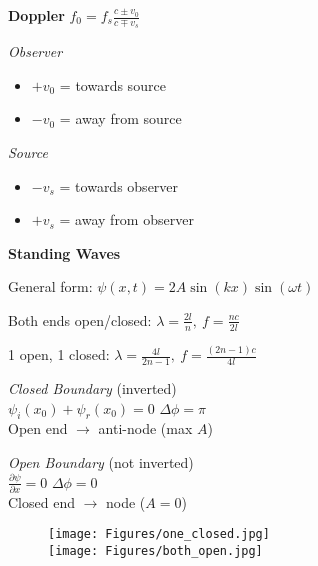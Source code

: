 \documentclass[twocolumn]{article}
\begin{document}
\small

\textbf{Doppler} \hspace{8em} $f_0 = f_s \frac{c \pm v_0}{c \mp v_s}$

\begin{multicols}{2}
    \textit{Observer} \vspace{-1em}
    \begin{itemize}
        \item $+v_0$ = towards source
        \item $-v_0$ = away from source
    \end{itemize}

    \textit{Source} \vspace{-1em}
    \begin{itemize}
        \item $-v_s$ = towards observer
        \item $+v_s$ = away from observer
    \end{itemize}
\end{multicols} \vspace{-1.5em}

\dotfill

\textbf{Standing Waves}

General form: $\psi(x, t) = 2A \sin(kx) \sin(\omega t)$

Both ends open/closed: $\lambda = \frac{2l}{n},\ f = \frac{nc}{2l}$

1 open, 1 closed: $\lambda = \frac{4l}{2n-1},\ f  = \frac{(2n-1)c}{4l}$

\begin{multicols}{2}
    \textit{Closed Boundary} (inverted) \\[5pt]
    $\psi_i(x_0) + \psi_r(x_0) = 0$ \hfill $\Delta \phi = \pi$ \\[5pt]
    Open end $\rightarrow$ anti-node (max $A$)

    \textit{Open Boundary} (not inverted) \\[5pt]
    $\frac{\partial \psi}{\partial x} = 0$ \hfil $\Delta \phi = 0$ \\[5pt]
    Closed end $\rightarrow$ node ($A = 0$)
\end{multicols} \vspace{-1em}

\begin{figure}[h]
    \centering
    \texttt{[image: Figures/one\_closed.jpg]} \\[1em]
    \texttt{[image: Figures/both\_open.jpg]}
\end{figure} \vspace{-1em}
\end{document}
